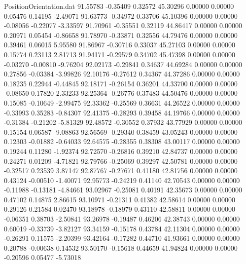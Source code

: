 \begin{filecontents}{PositionOrientation.dat}
  91.55783   -0.35409    0.32572    45.30296    0.00000    0.00000    0.05476    0.14195   -2.49071
  91.63773   -0.34972    0.33706    45.10396    0.00000    0.00000   -0.08056   -0.22077   -3.33597
  91.70961   -0.35551    0.32119    44.86417    0.00000    0.00000    0.20971    0.05454   -0.86658
  91.78970   -0.33871    0.32556    44.79476    0.00000    0.00000    0.39461    0.06015    5.95580
  91.86967   -0.30716    0.33037    45.27103    0.00000    0.00000    0.15774    0.23113    2.81713
  91.94171   -0.29579    0.34702    45.47398    0.00000    0.00000   -0.03270   -0.00810   -9.76204
  92.02173   -0.29841    0.34637    44.69284    0.00000    0.00000    0.27856   -0.03384   -3.99826
  92.10176   -0.27612    0.34367    44.37286    0.00000    0.00000    0.18235    0.22944   -0.44845
  92.18171   -0.26154    0.36201    44.33700    0.00000    0.00000   -0.08650    0.17820    2.33233
  92.25364   -0.26776    0.37483    44.50476    0.00000    0.00000    0.15085   -0.10649   -2.99475
  92.33362   -0.25569    0.36631    44.26522    0.00000    0.00000   -0.33993    0.35283   -0.84307
  92.41375   -0.28293    0.39458    44.19766    0.00000    0.00000   -0.31384   -0.21202   -5.81329
  92.48572   -0.30552    0.37932    43.77929    0.00000    0.00000    0.15154    0.06587   -9.08863
  92.56569   -0.29340    0.38459    43.05243    0.00000    0.00000    0.12303   -0.01882   -0.64033
  92.64575   -0.28355    0.38308    43.00117    0.00000    0.00000    0.19244    0.11280   -1.92374
  92.72570   -0.26816    0.39210    42.84737    0.00000    0.00000    0.24271    0.01209   -4.71821
  92.79766   -0.25069    0.39297    42.50781    0.00000    0.00000   -0.32517    0.23539    3.87147
  92.87767   -0.27671    0.41180    42.81756    0.00000    0.00000    0.43124   -0.00510   -1.40071
  92.95773   -0.24219    0.41140    42.70543    0.00000    0.00000   -0.11988   -0.13181   -4.84661
  93.02967   -0.25081    0.40191    42.35673    0.00000    0.00000    0.47102    0.14875    2.86615
  93.10971   -0.21311    0.41382    42.58614    0.00000    0.00000    0.29126    0.21584    0.02470
  93.18978   -0.18979    0.43110    42.58811    0.00000    0.00000   -0.06351    0.38703   -2.50841
  93.26978   -0.19487    0.46206    42.38743    0.00000    0.00000    0.60019   -0.33739   -3.82127
  93.34159   -0.15178    0.43784    42.11304    0.00000    0.00000   -0.26291    0.11575   -2.20399
  93.42164   -0.17282    0.44710    41.93661    0.00000    0.00000    0.20788   -0.00638    0.14532
  93.50170   -0.15618    0.44659    41.94824    0.00000    0.00000   -0.20596    0.05477   -5.73018

\end{filecontents}
